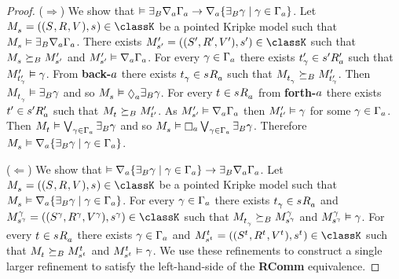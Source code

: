 \begin{proof}
($\Rightarrow$) 
We show that $\entails \somerefsBs \coversA \Gamma_\agentA \implies \coversA \{\somerefsBs \gamma \mid \gamma \in \Gamma_\agentA\}$.
Let $\kPModelAndTuple{\kStateS} \in \classK$ be a pointed Kripke model such that $\kPModel{\kStateS} \entails \somerefsBs \coversA \Gamma_\agentA$.
There exists $\kPModelAndTupleP{\kStateSP} \in \classK$ such that $\kPModel{\kStateS} \simulatesBs \kPModelP{\kStateSP}$ and $\kPModelP{\kStateSP} \entails \coversA \Gamma_\agentA$.
For every $\gamma \in \Gamma_\agentA$ there exists $\kStateTP_\gamma \in \kSuccessorsPA{\kStateSP}$ such that $\kPModelP{\kStateTP_\gamma} \entails \gamma$.
From {\bf back-$\agentA$} there exists $\kStateT_\gamma \in \kSuccessorsA{\kStateS}$ such that $\kPModel{\kStateT_\gamma} \simulatesBs \kPModelP{\kStateTP_\gamma}$.
Then $\kPModel{\kStateT_\gamma} \entails \somerefsBs \gamma$ and so $\kPModel{\kStateS} \entails \possibleA \somerefsBs \gamma$.
For every $\kStateT \in \kSuccessorsA{\kStateS}$ from {\bf forth-$\agentA$} there exists $\kStateTP \in \kSuccessorsPA{\kStateSP}$ such that $\kPModel{\kStateT} \simulatesBs \kPModelP{\kStateTP}$.
As $\kPModelP{\kStateSP} \entails \coversA \Gamma_\agentA$ then $\kPModelP{\kStateTP} \entails \gamma$ for some $\gamma \in \Gamma_\agentA$.
Then $\kPModel{\kStateT} \entails \bigvee_{\gamma \in \Gamma_\agentA} \somerefsBs \gamma$ and so $\kPModel{\kStateS} \entails \necessaryA \bigvee_{\gamma \in \Gamma_\agentA} \somerefsBs \gamma$.
Therefore $\kPModel{\kStateS} \entails \coversA \{\somerefsBs \gamma \mid \gamma \in \Gamma_\agentA\}$.

($\Leftarrow$)
We show that $\entails \coversA \{\somerefsBs \gamma \mid \gamma \in \Gamma_\agentA\} \implies \somerefsBs \coversA \Gamma_\agentA$.
Let $\kPModelAndTuple{\kStateS} \in \classK$ be a pointed Kripke model such that $\kPModel{\kStateS} \entails \coversA \{\somerefsBs \gamma \mid \gamma \in \Gamma_\agentA\}$.
For every $\gamma \in \Gamma_\agentA$ there exists $\kStateT_\gamma \in \kSuccessorsA{\kStateS}$ and $\kPModelAndTuple[\gamma]{\kStateS[\gamma]} \in \classK$ such that $\kPModel{\kStateT_\gamma} \simulatesBs \kPModel[\gamma]{\kStateS[\gamma]}$ and $\kPModel[\gamma]{\kStateS[\gamma]} \entails \gamma$.
For every $\kStateT \in \kSuccessorsA{\kStateS}$ there exists $\gamma \in \Gamma_\agentA$ and $\kPModelAndTuple[\kStateT]{\kStateS[\kStateT]} \in \classK$ such that $\kPModel{\kStateT} \simulatesBs \kPModel[\kStateT]{\kStateS[\kStateT]}$ and $\kPModel[\kStateT]{\kStateS[\kStateT]} \entails \gamma$.
We use these refinements to construct a single larger refinement to satisfy the left-hand-side of the {\bf RComm} equivalence.


\end{proof}
